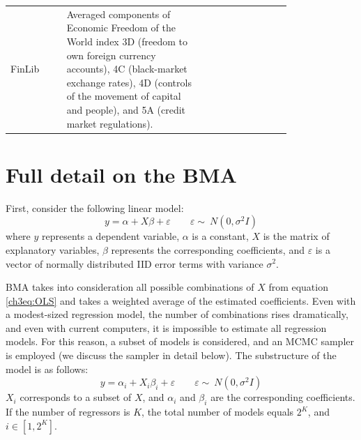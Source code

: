 \begin{refsection}
\begin{subappendices}
\begin{center}
\begin{longtable}{l p{0.50\linewidth} p{0.3\linewidth}}
      FinLib & Averaged components of Economic Freedom of the World index 3D (freedom to own foreign currency accounts), 4C (black-market exchange rates), 4D (controls of the movement of capital and people), and 5A (credit market regulations). & \href{https://www.fraserinstitute.org/economic-freedom/dataset}{\textcite{gwartney2017}} \\
    
    \end{longtable}
    \end{center}
    
    
    \newpage
    \section{Full detail on the BMA}
    \label{ch3sec:app_bma}
    First, consider the following linear model:
    \begin{equation}\label{ch3eq:OLS}
    y = \alpha + X\beta+ \varepsilon \qquad \varepsilon  \sim\ N(0, \sigma^{2}I)
    \end{equation}
    where $y$ represents a dependent variable, $\alpha$ is a constant, $X$ is the matrix of explanatory variables, $\beta$ represents the corresponding coefficients, and $\varepsilon$ is a vector of normally distributed \ac{IID} error terms with variance $\sigma^{2}$. 
    
    \ac{BMA} takes into consideration all possible combinations of $X$ from equation \ref{ch3eq:OLS} and takes a weighted average of the estimated coefficients. Even with a modest-sized regression model, the number of combinations rises dramatically, and even with current computers, it is impossible to estimate all regression models. For this reason, a subset of models is considered, and an \ac{MCMC} sampler is employed (we discuss the sampler in detail below). The substructure of the model is as follows:
    \begin{equation}\label{ch3eq:OLSsub}
    y = \alpha_{i} + X_{i}\beta_{i}+ \varepsilon \qquad \varepsilon  \sim\ N(0, \sigma^{2}I)
    \end{equation}
    $X_{i}$ corresponds to a subset of $X$, and $\alpha_{i} $ and $ \beta_{i}$ are the corresponding coefficients. If the number of regressors is $K$, the total number of models equals $2^{K}$, and $i \in [1,2^{K}]$. 
    

\end{subappendices}
\end{refsection}

